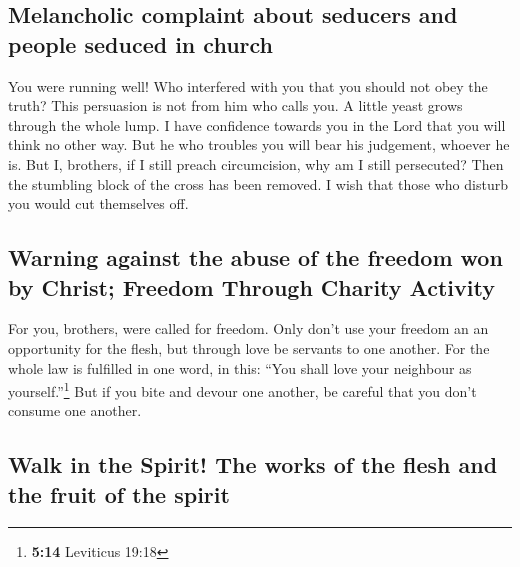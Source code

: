\hypertarget{melancholic-complaint-about-seducers-and-people-seduced-in-church}{%
\subsection{Melancholic complaint about seducers and people seduced in
church}\label{melancholic-complaint-about-seducers-and-people-seduced-in-church}}

 You were running well! Who interfered with you that you
should not obey the truth?  This persuasion is not from
him who calls you.  A little yeast grows through the whole
lump.  I have confidence towards you in the Lord that you
will think no other way. But he who troubles you will bear his
judgement, whoever he is.  But I, brothers, if I still
preach circumcision, why am I still persecuted? Then the stumbling block
of the cross has been removed.  I wish that those who
disturb you would cut themselves off.

\hypertarget{warning-against-the-abuse-of-the-freedom-won-by-christ-freedom-through-charity-activity}{%
\subsection{Warning against the abuse of the freedom won by Christ;
Freedom Through Charity
Activity}\label{warning-against-the-abuse-of-the-freedom-won-by-christ-freedom-through-charity-activity}}

 For you, brothers, were called for freedom. Only don't
use your freedom an an opportunity for the flesh, but through love be
servants to one another.  For the whole law is fulfilled
in one word, in this: ``You shall love your neighbour as
yourself.''\footnote{\textbf{5:14} Leviticus 19:18}  But
if you bite and devour one another, be careful that you don't consume
one another.

\hypertarget{walk-in-the-spirit-the-works-of-the-flesh-and-the-fruit-of-the-spirit}{%
\subsection{Walk in the Spirit! The works of the flesh and the fruit of
the
spirit}\label{walk-in-the-spirit-the-works-of-the-flesh-and-the-fruit-of-the-spirit}}

